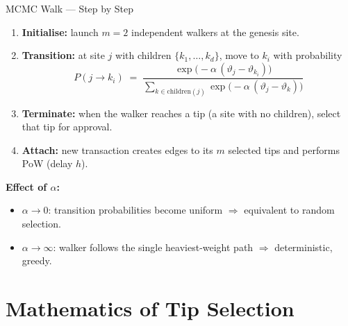 \documentclass[aspectratio=169]{beamer}
\begin{document}
\begin{frame}{MCMC Walk --- Step by Step}
  \begin{enumerate}
    \item \textbf{Initialise:} launch $m=2$ independent walkers at the genesis site.
    \item \textbf{Transition:} at site $j$ with children $\{k_1,\dots,k_d\}$, move to $k_i$ with probability
      \[
        P(j \to k_i)
        \;=\;
        \frac{\exp\!\bigl(-\alpha\,(\vartheta_j - \vartheta_{k_i})\bigr)}
             {\displaystyle\sum_{k \in \text{children}(j)}
              \exp\!\bigl(-\alpha\,(\vartheta_j - \vartheta_{k})\bigr)}
      \]
    \item \textbf{Terminate:} when the walker reaches a tip (a site with no children), select that tip for approval.
    \item \textbf{Attach:} new transaction creates edges to its $m$ selected tips and performs PoW (delay $h$).
  \end{enumerate}

  \bigskip
  \textbf{Effect of $\alpha$:}
  \begin{itemize}
    \item $\alpha \to 0$: transition probabilities become uniform $\Rightarrow$ equivalent to random selection.
    \item $\alpha \to \infty$: walker follows the single heaviest-weight path $\Rightarrow$ deterministic, greedy.
  \end{itemize}
\end{frame}

\section{Mathematics of Tip Selection}
\end{document}
